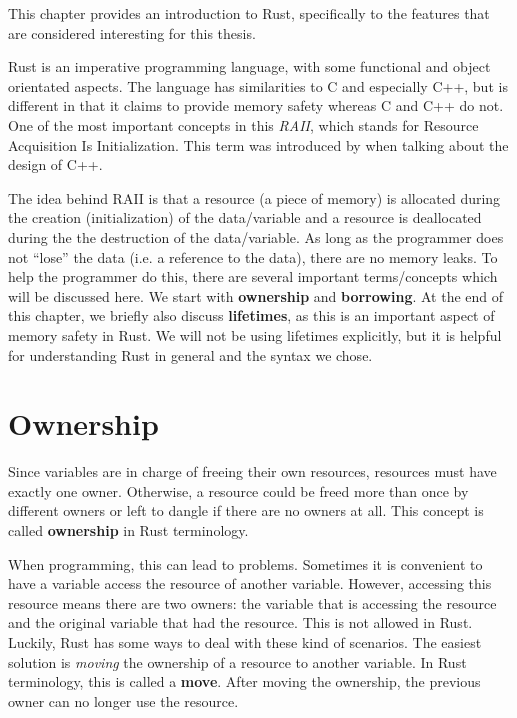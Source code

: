 This chapter provides an introduction to Rust, specifically to the features that are considered interesting for this thesis. 

Rust is an imperative programming language, with some functional and object orientated aspects. The language has similarities to C and especially C++, but is different in that it claims to provide memory safety whereas C and C++ do not. One of the most important concepts in this \emph{RAII}, which stands for Resource Acquisition Is Initialization. This term was introduced by \cite{stroustrup1994design} when talking about the design of C++.

The idea behind RAII is that a resource (a piece of memory) is allocated during the creation (initialization) of the data/variable and a resource is deallocated during the the destruction of the data/variable. As long as the programmer does not ``lose'' the data (i.e. a reference to the data), there are no memory leaks. To help the programmer do this, there are several important terms/concepts which will be discussed here. We start with \textbf{ownership} and \textbf{borrowing}. At the end of this chapter, we briefly also discuss \textbf{lifetimes}, as this is an important aspect of memory safety in Rust. We will not be using lifetimes explicitly, but it is helpful for understanding Rust in general and the syntax we chose.  

\section{Ownership} %
Since variables are in charge of freeing their own resources, resources must have exactly one owner. Otherwise, a resource could be freed more than once by different owners or left to dangle if there are no owners at all. This concept is called \textbf{ownership} in Rust terminology. 

When programming, this can lead to problems. Sometimes it is convenient to have a variable access the resource of another variable. However, accessing this resource  means there are two owners: the variable that is accessing the resource and the original variable that had the resource. This is not allowed in Rust. Luckily, Rust has some ways to deal with these kind of scenarios. The easiest solution is \emph{moving} the ownership of a resource to another variable. In Rust terminology, this is called a \textbf{move}. After moving the ownership, the previous owner can no longer use the resource. 


